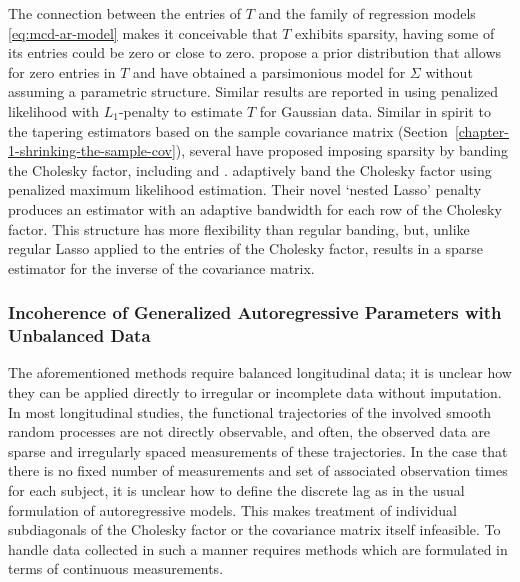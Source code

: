 The connection between the entries of $T$ and the family of regression models \eqref{eq:mcd-ar-model} makes it conceivable that $T$  exhibits sparsity, having some of its entries could be zero or close to zero. \cite{smith2002parsimonious} propose a prior distribution that allows for zero entries in $T$ and have obtained a parsimonious model for $\Sigma$ without assuming a parametric structure. Similar results are reported in \cite{huang2006covariance} using penalized likelihood with $L_1$-penalty to estimate $T$ for Gaussian data. Similar in spirit to the tapering estimators based on the sample covariance matrix (Section~\ref{chapter-1-shrinking-the-sample-cov}), several have proposed imposing sparsity by banding the Cholesky factor, including \cite{wu2003nonparametric} and \cite{huang2006covariance}. \cite{levina2008sparse} adaptively band the Cholesky factor using penalized maximum likelihood estimation. Their novel `nested Lasso' penalty produces an estimator with an adaptive bandwidth for each row of the Cholesky factor. This structure has more flexibility than regular banding, but, unlike regular Lasso applied to the entries of the Cholesky factor, results in a sparse estimator for the inverse of the covariance matrix.


\subsubsection{Incoherence of Generalized Autoregressive Parameters with Unbalanced Data}

The aforementioned methods require balanced longitudinal data; it is unclear how they can be applied directly to irregular or incomplete data without imputation. In most longitudinal studies, the functional trajectories of the involved smooth random processes are not directly observable, and often, the observed data are sparse and irregularly spaced measurements of these trajectories. In the case that there is no fixed number of measurements and set of associated observation times for each subject, it is unclear how to define the discrete lag as in the usual formulation of autoregressive models. This makes treatment of individual subdiagonals of the Cholesky factor or the covariance matrix itself infeasible. To handle data collected in such a manner requires methods which are formulated in terms of continuous measurements.
 
 \bigskip 
 
